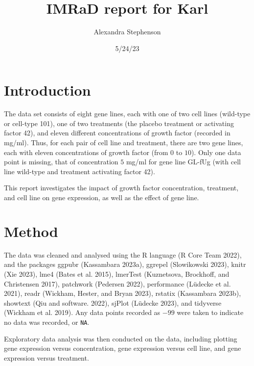 \documentclass[
  letterpaper,
  DIV=11,
  numbers=noendperiod]{scrartcl}
\title{IMRaD report for Karl}
\author{Alexandra Stephenson}
\date{5/24/23}
\begin{document}
\maketitle
\ifdefined\Shaded\renewenvironment{Shaded}{\begin{tcolorbox}[breakable, frame hidden, sharp corners, boxrule=0pt, interior hidden, borderline west={3pt}{0pt}{shadecolor}, enhanced]}{\end{tcolorbox}}\fi

\hypertarget{introduction}{%
\section{Introduction}\label{introduction}}

The data set consists of eight gene lines, each with one of two cell
lines (wild-type or cell-type 101), one of two treatments (the placebo
treatment or activating factor 42), and eleven different concentrations
of growth factor (recorded in mg/ml). Thus, for each pair of cell line
and treatment, there are two gene lines, each with eleven concentrations
of growth factor (from \(0\) to \(10\)). Only one data point is missing,
that of concentration \(5\) mg/ml for gene line GL-fUg (with cell line
wild-type and treatment activating factor 42).

This report investigates the impact of growth factor concentration,
treatment, and cell line on gene expression, as well as the effect of
gene line.

\hypertarget{method}{%
\section{Method}\label{method}}

The data was cleaned and analysed using the R language (R Core Team
2022), and the packages ggpubr (Kassambara 2023a), ggrepel (Slowikowski
2023), knitr (Xie 2023), lme4 (Bates et al. 2015), lmerTest (Kuznetsova,
Brockhoff, and Christensen 2017), patchwork (Pedersen 2022), performance
(Lüdecke et al. 2021), readr (Wickham, Hester, and Bryan 2023), rstatix
(Kassambara 2023b), showtext (Qiu and software. 2022), sjPlot (Lüdecke
2023), and tidyverse (Wickham et al. 2019). Any data points recorded as
\(-99\) were taken to indicate no data was recorded, or \texttt{NA}.

Exploratory data analysis was then conducted on the data, including
plotting gene expression versus concentration, gene expression versus
cell line, and gene expression versus treatment.
\end{document}

